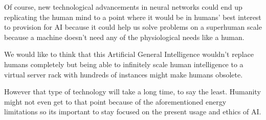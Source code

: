 \documentclass[letterpaper,11pt,leqno]{article}
\begin{document}
Of course, new technological advancements in neural networks could end up replicating the human mind to a point where it would be in humans' best interest to provision for AI because it could help us solve problems on a superhuman scale because a machine doesn't need any of the physiological needs like a human.

We would like to think that this Artificial General Intelligence wouldn't replace humans completely but being able to infinitely scale human intelligence to a virtual server rack with hundreds of instances might make humans obsolete.

However that type of technology will take a long time, to say the least. Humanity might not even get to that point because of the aforementioned energy limitations so its important to stay focused on the present usage and ethics of AI.

\pagebreak

\printbibliography
\end{document}
